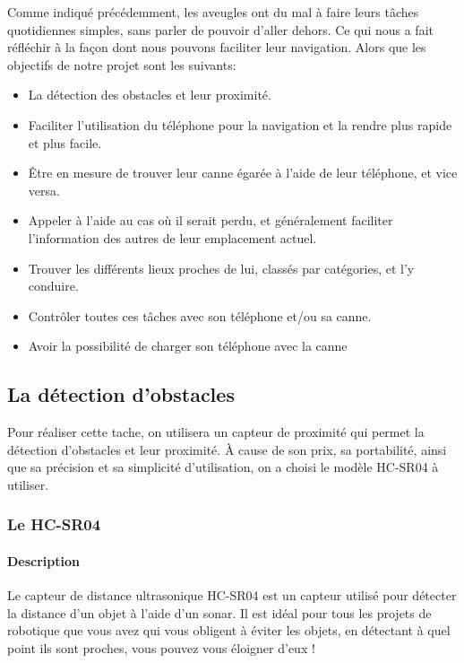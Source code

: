 Comme indiqué précédemment, les aveugles ont du mal à faire leurs tâches quotidiennes simples, sans parler de pouvoir d'aller dehors. Ce qui nous a fait réfléchir à la façon dont nous pouvons faciliter leur navigation. Alors que les objectifs de notre projet sont les suivants:
\begin{itemize}
    \item La détection des obstacles et leur proximité.
    \item Faciliter l’utilisation du téléphone pour la navigation et la rendre plus rapide et plus facile.
    \item Être en mesure de trouver leur canne égarée à l’aide de leur téléphone, et vice versa.
    \item Appeler à l’aide au cas où il serait perdu, et généralement faciliter l’information des autres de leur emplacement actuel.
    \item Trouver les différents lieux proches de lui, classés par catégories, et l’y conduire.
    \item Contrôler toutes ces tâches avec son téléphone et/ou sa canne.
    \item Avoir la possibilité de charger son téléphone avec la canne
\end{itemize}

\subsection{La détection d’obstacles}

Pour réaliser cette tache, on utilisera un capteur de proximité qui permet la détection d'obstacles et leur proximité.
À cause de son prix, sa portabilité, ainsi que sa précision et sa simplicité d'utilisation, on a choisi le modèle HC-SR04 à utiliser.


\subsubsection{Le HC-SR04}

\paragraph{Description}
Le capteur de distance ultrasonique HC-SR04 est un capteur utilisé pour détecter la distance d’un objet à l’aide d’un sonar. Il est idéal pour tous les projets de robotique que vous avez qui vous obligent à éviter les objets, en détectant à quel point ils sont proches, vous pouvez vous éloigner d’eux \cite{piborg-hc-sr04}!


